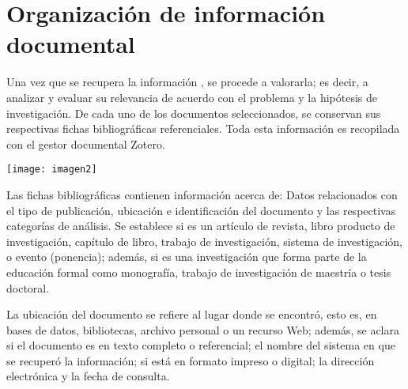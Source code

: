 
\setchapterpreamble[u]{\margintoc}

\chapter{Organización de información documental }
\label{ch:org-info}

 Una vez que se recupera la información , se procede a valorarla; es decir, a analizar y evaluar su relevancia de acuerdo con el problema y la hipótesis de investigación. De cada uno de los documentos seleccionados, se conservan sus respectivas fichas bibliográficas referenciales. Toda esta información es recopilada con el gestor documental Zotero.
 
 
 	\begin{marginfigure}[7cm]%
 		\texttt{[image: imagen2]}
 	\end{marginfigure}
 
 	
 	
 
Las fichas bibliográficas contienen información acerca de:
 Datos relacionados con el tipo de publicación, ubicación e identificación del documento y las respectivas categorías de análisis. Se establece si es un artículo de revista, libro producto de investigación, capítulo de libro, trabajo de investigación, sistema de investigación, o evento (ponencia); además, si es una   investigación que forma parte de la educación formal como monografía, trabajo de investigación de maestría o tesis doctoral. 
 
 
 La ubicación del documento se refiere al lugar donde se encontró, esto es, en bases de datos, bibliotecas, archivo personal o un recurso Web; además, se aclara si el documento es en texto completo o referencial; el nombre del sistema en que se recuperó la información; si está en formato impreso o digital; la dirección electrónica y la fecha de consulta. 
 
